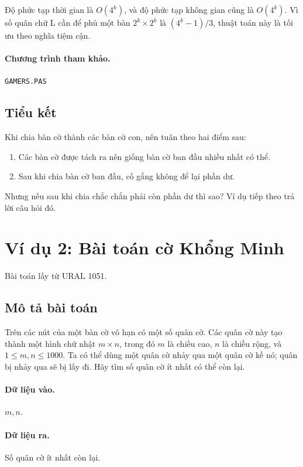 \documentclass[11pt]{article}
\begin{document}
Độ phức tạp thời gian là \(O(4^k)\), và độ phức tạp không gian cũng là
\(O(4^k)\). Vì số quân chữ L cần để phủ một bàn
\(2^k\times 2^k\) là \((4^k-1)/3\), thuật toán này là tối ưu theo nghĩa tiệm
cận.

\paragraph{Chương trình tham khảo.}
\texttt{GAMERS.PAS}

\subsection{Tiểu kết}

Khi chia bàn cờ thành các bàn cờ con, nên tuân theo hai điểm sau:
\begin{enumerate}
  \item Các bàn cờ được tách ra nên giống bàn cờ ban đầu nhiều nhất có thể.
  \item Sau khi chia bàn cờ ban đầu, cố gắng không để lại phần dư.
\end{enumerate}

Nhưng nếu sau khi chia chắc chắn phải còn phần dư thì sao? Ví dụ tiếp theo trả
lời câu hỏi đó.

\section{Ví dụ 2: Bài toán cờ Khổng Minh}

Bài toán lấy từ URAL 1051.

\subsection{Mô tả bài toán}

Trên các nút của một bàn cờ vô hạn có một số quân cờ. Các quân cờ này tạo
thành một hình chữ nhật \(m\times n\), trong đó \(m\) là chiều cao,
\(n\) là chiều rộng, và \(1\le m,n\le 1000\). Ta có thể dùng một quân cờ nhảy
qua một quân cờ kề nó; quân bị nhảy qua sẽ bị lấy đi. Hãy tìm số quân cờ ít
nhất có thể còn lại.

\paragraph{Dữ liệu vào.}
\(m,n\).

\paragraph{Dữ liệu ra.}
Số quân cờ ít nhất còn lại.
\end{document}
